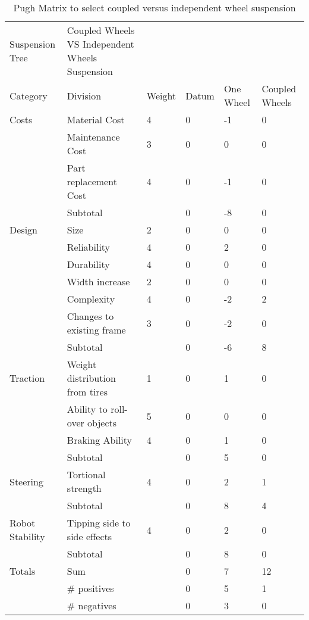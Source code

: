  \begin{table}
\centering
\caption{Pugh Matrix to select coupled versus independent wheel suspension}
\begin{tabular}{| llllll |} \hline
Suspension Tree & Coupled Wheels VS Independent Wheels Suspension &  &  &  &  & \\
Category & Division & Weight & Datum & One Wheel & Coupled Wheels & \\
Costs & Material Cost & 4 & 0 & -1 & 0 & \\
 & Maintenance Cost & 3 & 0 & 0 & 0 & \\
 & Part replacement Cost & 4 & 0 & -1 & 0 & \\
 & Subtotal &  & 0 & -8 & 0 & \\
Design & Size & 2 & 0 & 0 & 0 & \\
 & Reliability & 4 & 0 & 2 & 0 & \\
 & Durability & 4 & 0 & 0 & 0 & \\
 & Width increase & 2 & 0 & 0 & 0 & \\
 & Complexity & 4 & 0 & -2 & 2 & \\
 & Changes to existing frame & 3 & 0 & -2 & 0 & \\
 & Subtotal &  & 0 & -6 & 8 & \\
Traction & Weight distribution from tires & 1 & 0 & 1 & 0 & \\
 & Ability to roll-over objects & 5 & 0 & 0 & 0 & \\
 & Braking Ability & 4 & 0 & 1 & 0 & \\
 & Subtotal &  & 0 & 5 & 0 & \\
Steering & Tortional strength & 4 & 0 & 2 & 1 & \\
 & Subtotal &  & 0 & 8 & 4 & \\
Robot Stability & Tipping side to side effects & 4 & 0 & 2 & 0 & \\
 & Subtotal &  & 0 & 8 & 0 & \\
Totals & Sum &  & 0 & 7 & 12 & \\
 & \# positives &  & 0 & 5 & 1 & \\
 & \# negatives &  & 0 & 3 & 0 & \\
 \end{tabular}
 \label{tab:pugh_coup}
 \end{table}
 
